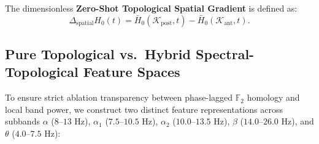 \documentclass[10pt,twocolumn]{article}
\begin{document}
The dimensionless \textbf{Zero-Shot Topological Spatial Gradient} is defined as:
\begin{equation}
    \Delta_{\mathrm{spatial}} H_0(t) = \bar{H}_0(\mathcal{K}_{\mathrm{post}}, t) - \bar{H}_0(\mathcal{K}_{\mathrm{ant}}, t).
    \label{eq:grad}
\end{equation}

\subsection{Pure Topological vs.\ Hybrid Spectral-Topological Feature Spaces}
To ensure strict ablation transparency between phase-lagged $\mathbb{F}_2$ homology and local band power, we construct two distinct feature representations across subbands $\alpha$ ($8\text{--}13\text{ Hz}$), $\alpha_1$ ($7.5\text{--}10.5\text{ Hz}$), $\alpha_2$ ($10.0\text{--}13.5\text{ Hz}$), $\beta$ ($14.0\text{--}26.0\text{ Hz}$), and $\theta$ ($4.0\text{--}7.5\text{ Hz}$):
\end{document}
